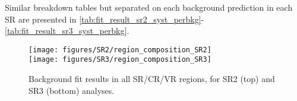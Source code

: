 Similar breakdown tables but separated on each background prediction in each SR are presented in \Tab \ref{tab:fit_result_sr2_syst_perbkg}-\ref{tab:fit_result_sr3_syst_perbkg}.


\begin{figure}[h!]
  \begin{center}
     \texttt{[image: figures/SR2/region\_composition\_SR2]} \\
     \texttt{[image: figures/SR3/region\_composition\_SR3]}
     \caption{Background fit results in all SR/CR/VR regions, for SR2 (top) and SR3 (bottom) analyses.}
     \label{fig:fit_region_composition}
  \end{center}
\end{figure}









